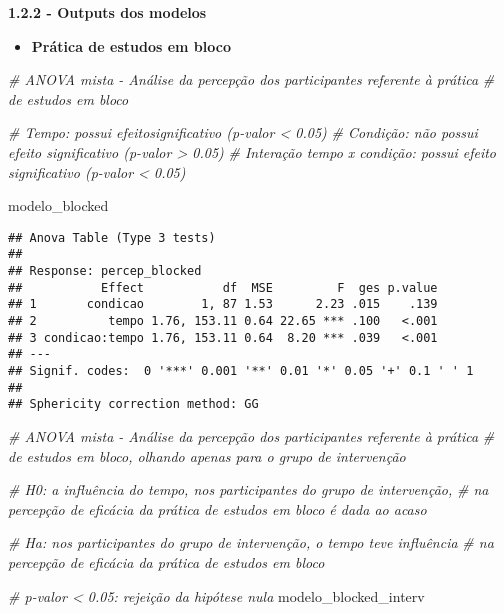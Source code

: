 \documentclass[
]{article}
\newenvironment{Shaded}{\begin{snugshade}}{\end{snugshade}}
\newcommand{\CommentTok}[1]{\textcolor[rgb]{0.56,0.35,0.01}{\textit{#1}}}
\newcommand{\NormalTok}[1]{#1}
\providecommand{\tightlist}{%
  \setlength{\itemsep}{0pt}\setlength{\parskip}{0pt}}
\begin{document}
\textbf{1.2.2 - Outputs dos modelos}

\begin{itemize}
\tightlist
\item
  \textbf{Prática de estudos em bloco}
\end{itemize}

\begin{Shaded}
\begin{Highlighting}[]
\CommentTok{\# ANOVA mista {-} Análise da percepção dos participantes referente à prática}
\CommentTok{\# de estudos em bloco}

\CommentTok{\# Tempo: possui efeitosignificativo (p{-}valor \textless{} 0.05)}
\CommentTok{\# Condição: não possui efeito significativo (p{-}valor \textgreater{} 0.05)}
\CommentTok{\# Interação tempo x condição: possui efeito significativo (p{-}valor \textless{} 0.05)}

\NormalTok{modelo\_blocked}
\end{Highlighting}
\end{Shaded}

\begin{verbatim}
## Anova Table (Type 3 tests)
## 
## Response: percep_blocked
##           Effect           df  MSE         F  ges p.value
## 1       condicao        1, 87 1.53      2.23 .015    .139
## 2          tempo 1.76, 153.11 0.64 22.65 *** .100   <.001
## 3 condicao:tempo 1.76, 153.11 0.64  8.20 *** .039   <.001
## ---
## Signif. codes:  0 '***' 0.001 '**' 0.01 '*' 0.05 '+' 0.1 ' ' 1
## 
## Sphericity correction method: GG
\end{verbatim}

\begin{Shaded}
\begin{Highlighting}[]
\CommentTok{\# ANOVA mista {-} Análise da percepção dos participantes referente à prática}
\CommentTok{\# de estudos em bloco, olhando apenas para o grupo de intervenção}

\CommentTok{\# H0: a influência do tempo, nos participantes do grupo de intervenção,}
\CommentTok{\# na percepção de eficácia da prática de estudos em bloco é dada ao acaso}

\CommentTok{\# Ha: nos participantes do grupo de intervenção, o tempo teve influência}
\CommentTok{\# na percepção de eficácia da prática de estudos em bloco}

\CommentTok{\# p{-}valor \textless{} 0.05: rejeição da hipótese nula}
\NormalTok{modelo\_blocked\_interv}
\end{Highlighting}
\end{Shaded}
\end{document}

